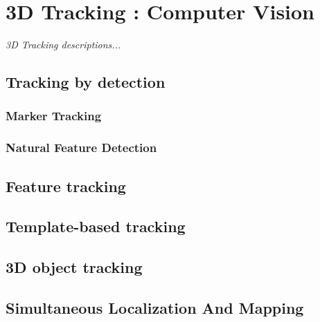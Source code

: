 \chapter{3D Tracking : Computer Vision}\label{ch:3Dtracking}
\begin{center}
{\small\em 3D Tracking descriptions...}
\end{center}

\section{Tracking by detection}
\subsection{Marker Tracking}
\subsection{Natural Feature Detection}

\section{Feature tracking}

\section{Template-based tracking}

\section{3D object tracking}

\section{Simultaneous Localization And Mapping}

\newpage